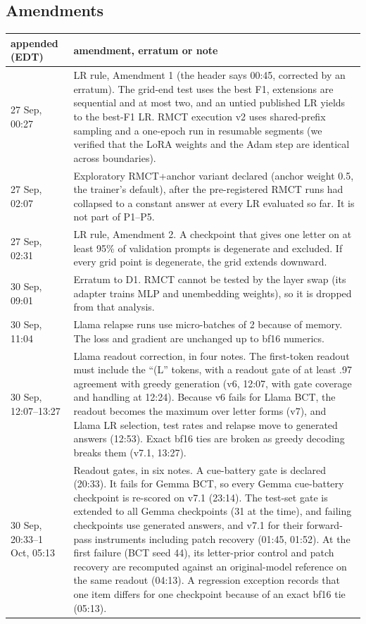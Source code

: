 \documentclass[11pt]{article}
\newcommand{\gemma}{Gemma}\newcommand{\gemmafull}{Gemma-2-2B-it}
\newcommand{\llama}{Llama}\newcommand{\llamafull}{Llama-3.1-8B-Instruct}
\begin{document}
\subsection{Amendments}
\begin{table}[t]\centering\scriptsize\setlength{\tabcolsep}{3pt}
\begin{tabular}{l p{12.7cm}}
\toprule
appended (EDT) & amendment, erratum or note \\
\midrule
27 Sep, 00:27 & LR rule, Amendment 1 (the header says 00:45, corrected by an erratum). The grid-end test uses the best F1, extensions are sequential and at most two, and an untied published LR yields to the best-F1 LR. RMCT execution v2 uses shared-prefix sampling and a one-epoch run in resumable segments (we verified that the LoRA weights and the Adam step are identical across boundaries). \\
27 Sep, 02:07 & Exploratory RMCT+anchor variant declared (anchor weight 0.5, the trainer's default), after the pre-registered RMCT runs had collapsed to a constant answer at every LR evaluated so far. It is not part of P1--P5. \\
27 Sep, 02:31 & LR rule, Amendment 2. A checkpoint that gives one letter on at least 95\% of validation prompts is degenerate and excluded. If every grid point is degenerate, the grid extends downward. \\
30 Sep, 09:01 & Erratum to D1. RMCT cannot be tested by the layer swap (its adapter trains MLP and unembedding weights), so it is dropped from that analysis. \\
30 Sep, 11:04 & \llama{} relapse runs use micro-batches of 2 because of memory. The loss and gradient are unchanged up to bf16 numerics. \\
30 Sep, 12:07--13:27 & \llama{} readout correction, in four notes. The first-token readout must include the ``(L'' tokens, with a readout gate of at least .97 agreement with greedy generation (v6, 12:07, with gate coverage and handling at 12:24). Because v6 fails for \llama{} BCT, the readout becomes the maximum over letter forms (v7), and \llama{} LR selection, test rates and relapse move to generated answers (12:53). Exact bf16 ties are broken as greedy decoding breaks them (v7.1, 13:27). \\
30 Sep, 20:33--1 Oct, 05:13 & Readout gates, in six notes. A cue-battery gate is declared (20:33). It fails for \gemma{} BCT, so every \gemma{} cue-battery checkpoint is re-scored on v7.1 (23:14). The test-set gate is extended to all \gemma{} checkpoints (31 at the time), and failing checkpoints use generated answers, and v7.1 for their forward-pass instruments including patch recovery (01:45, 01:52). At the first failure (BCT seed 44), its letter-prior control and patch recovery are recomputed against an original-model reference on the same readout (04:13). A regression exception records that one item differs for one checkpoint because of an exact bf16 tie (05:13). \\

\end{tabular}
\end{table}
\end{document}

